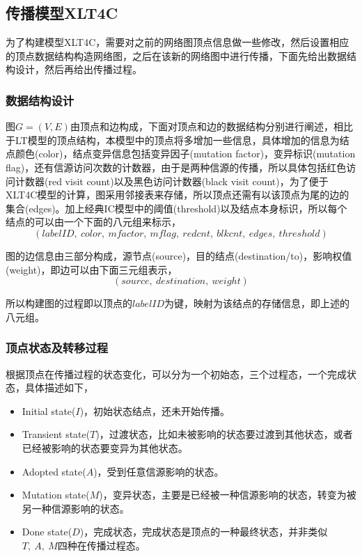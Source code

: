 \subsection{传播模型XLT4C}
为了构建模型XLT4C，需要对之前的网络图顶点信息做一些修改，然后设置相应的顶点数据结构构造网络图，之后在该新的网络图中进行传播，下面先给出数据结构设计，然后再给出传播过程。

\subsubsection{数据结构设计}
\label{sec:xlt4c:ds-design}
图$G=(V,E)$由顶点和边构成，下面对顶点和边的数据结构分别进行阐述，相比于LT模型的顶点结构，本模型中的顶点将多增加一些信息，具体增加的信息为结点颜色(color)，结点变异信息包括变异因子(mutation factor)，变异标识(mutation flag)，还有信源访问次数的计数器，由于是两种信源的传播，所以具体包括红色访问计数器(red visit count)以及黑色访问计数器(black visit count)，为了便于XLT4C模型的计算，图采用邻接表来存储，所以顶点还需有以该顶点为尾的边的集合(edges)。加上经典IC模型中的阈值(threshold)以及结点本身标识，所以每个结点的可以由一个下面的八元组来标示，
\begin{displaymath}
(labelID, ~color, ~mfactor, ~mflag, ~redcnt, ~blkcnt, ~edges, ~threshold)
\end{displaymath}


图的边信息由三部分构成，源节点(source)，目的结点(destination/to)，影响权值(weight)，即边可以由下面三元组表示，
\begin{displaymath}
(source, ~destination, ~weight)
\end{displaymath}

所以构建图的过程即以顶点的$labelID$为键，映射为该结点的存储信息，即上述的八元组。

\subsubsection{顶点状态及转移过程}
\label{sec:xlt4c:state-xtran}
根据顶点在传播过程的状态变化，可以分为一个初始态，三个过程态，一个完成状态，具体描述如下，
\begin{itemize}
\item Initial state($I$)，初始状态结点，还未开始传播。
\item Transient state($T$)，过渡状态，比如未被影响的状态要过渡到其他状态，或者已经被影响的状态要变异为其他状态。
\item Adopted state($A$)，受到任意信源影响的状态。
\item Mutation state($M$)，变异状态，主要是已经被一种信源影响的状态，转变为被另一种信源影响的状态。
\item Done state($D$)，完成状态，完成状态是顶点的一种最终状态，并非类似$T, ~A, ~M$四种在传播过程态。
\end{itemize}

